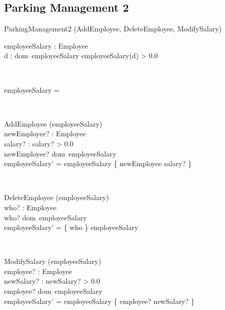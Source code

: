 \documentclass[12pt]{article}
\begin{document}
\begin{spacing}{1.5}
\newpage

\section{Parking Management 2}

\begin{class}{ParkingManagement2}
\also
\upharpoonright (AddEmployee, DeleteEmployee, ModifySalary) \\
\begin{state}
employeeSalary : Employee \pfun {}\\
\where
\forall d : dom~employeeSalary \bullet employeeSalary(d) > 0.0
\end{state} \\
\begin{init}
employeeSalary = \emptyset %
\end{init} \\
\begin{op}{AddEmployee}
\Delta (employeeSalary) \\
newEmployee? : Employee\\
salary? : 
\ST
salary? > 0.0 \\
newEmployee? \notin dom~employeeSalary\\
employeeSalary' = employeeSalary \cup \{ newEmployee \mapsto salary? \}
\end{op}\\
\begin{op}{DeleteEmployee}
\Delta (employeeSalary) \\
who? : Employee\\
\ST
who? \in dom~employeeSalary\\
employeeSalary' = \{ who \} \ndres employeeSalary
\end{op}\\
\begin{op}{ModifySalary}
\Delta (employeeSalary) \\
employee? : Employee\\
newSalary? : 
\ST
newSalary? > 0.0 \\
employee? \in dom~employeeSalary\\
employeeSalary' = employeeSalary \oplus \{ employee? \mapsto newSalary? \}
\end{op}\\
\end{class}





\end{spacing}
\end{document}
